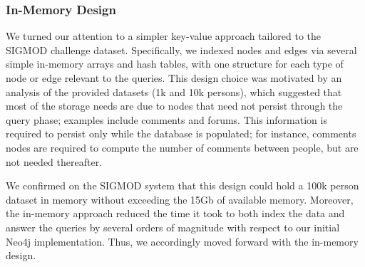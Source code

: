\documentclass{article}
\begin{document}
\subsubsection{In-Memory Design}
We turned our attention to a simpler key-value approach tailored to
the SIGMOD challenge dataset.  Specifically, we indexed nodes and
edges via several simple in-memory arrays and hash tables, with one
structure for each type of node or edge relevant to the queries.  This
design choice was motivated by an analysis of the provided datasets
(1k and 10k persons), which suggested that most of the storage needs
are due to nodes that need not persist through the query phase;
examples include comments and forums. This information is required to
persist only while the database is populated; for instance, comments
nodes are required to compute the number of comments between people,
but are not needed thereafter.  

We confirmed on the SIGMOD system that
this design could hold a 100k person dataset in memory without
exceeding the 15Gb of available memory. Moreover, the in-memory approach 
reduced the time it took to both index the data and answer the queries 
by several orders of magnitude with respect to our initial Neo4j implementation.  Thus, 
we accordingly moved forward with the in-memory design.


\end{document}

